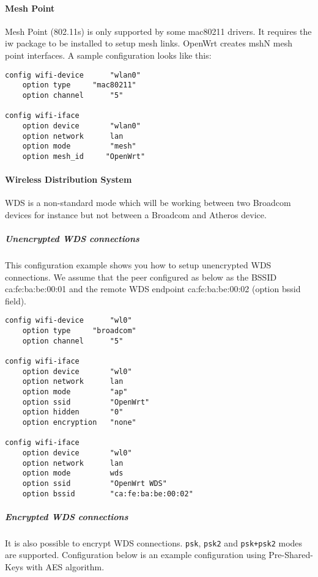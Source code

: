 \paragraph{Mesh Point}

Mesh Point (802.11s) is only supported by some mac80211 drivers. It requires the iw package
to be installed to setup mesh links. OpenWrt creates mshN mesh point interfaces. A sample
configuration looks like this:

\begin{Verbatim}
config wifi-device      "wlan0"
    option type		"mac80211"
    option channel      "5"

config wifi-iface
    option device       "wlan0"
    option network  	lan
    option mode         "mesh"
    option mesh_id     "OpenWrt"
\end{Verbatim}

\paragraph{Wireless Distribution System}

WDS is a non-standard mode which will be working between two Broadcom devices for instance
but not between a Broadcom and Atheros device.

\subparagraph{Unencrypted WDS connections}

This configuration example shows you how to setup unencrypted WDS connections.
We assume that the peer configured as below as the BSSID ca:fe:ba:be:00:01
and the remote WDS endpoint ca:fe:ba:be:00:02 (option bssid field).

\begin{Verbatim}
config wifi-device      "wl0"
    option type		"broadcom"
    option channel      "5"

config wifi-iface
    option device       "wl0"
    option network  	lan
    option mode         "ap"
    option ssid         "OpenWrt"
    option hidden       "0"
    option encryption   "none"

config wifi-iface
    option device       "wl0"
    option network      lan
    option mode         wds
    option ssid         "OpenWrt WDS"
    option bssid        "ca:fe:ba:be:00:02"
\end{Verbatim}

\subparagraph{Encrypted WDS connections}

It is also possible to encrypt WDS connections. \texttt{psk}, \texttt{psk2} and
\texttt{psk+psk2} modes are supported. Configuration below is an example
configuration using Pre-Shared-Keys with AES algorithm.

